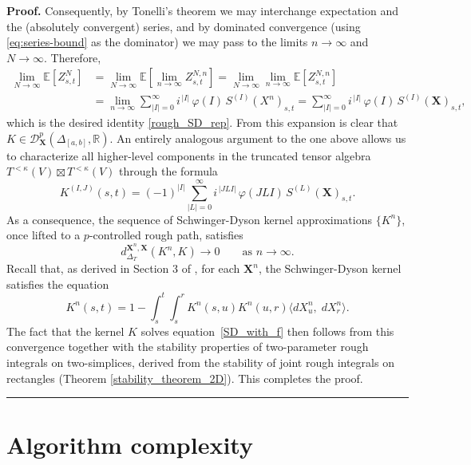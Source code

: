 \documentclass{article}%
\newenvironment{proof}[1][Proof]{\noindent\textbf{#1.} }{\ \rule{0.5em}{0.5em}}
\begin{document}
\begin{proof}
Consequently, by Tonelli’s theorem we may interchange expectation and the (absolutely
convergent) series, and by dominated convergence (using \eqref{eq:series-bound} as the
dominator) we may pass to the limits \(n\to\infty\) and \(N\to\infty\). Therefore,
\[
\begin{aligned}
\lim_{N\to\infty}\mathbb E\left[Z^N_{s,t}\right]
&= \lim_{N\to\infty}\mathbb E\!\left[\lim_{n\to\infty} Z^{N,n}_{s,t}\right]
 = \lim_{N\to\infty}\lim_{n\to\infty}\mathbb E\left[Z^{N,n}_{s,t}\right] \\
&= \lim_{n\to\infty}\sum_{|I|=0}^{\infty} i^{\,|I|}\,\varphi(I)\,S^{(I)}(X^n)_{s,t}
 = \sum_{|I|=0}^{\infty} i^{\,|I|}\,\varphi(I)\,S^{(I)}(\mathbf X)_{s,t},
\end{aligned}
\]
which is the desired identity \eqref{rough_SD_rep}.\newline
From this expansion is clear that $K \in \mathcal{D}^p_{\mathbf{X}}(\Delta_{[a,b]}, \mathbb{R})$. An entirely analogous argument to the one above allows us to characterize all higher-level components in the truncated tensor algebra $T^{<\kappa}(V) \boxtimes T^{<\kappa}(V)$ through the formula
\[
K^{(I, J)}(s,t)
= (-1)^{|I|}\sum_{|L|=0}^{\infty} i^{\,|JLI|}\,\varphi(JLI)\, S^{(L)}(\mathbf{X})_{s,t}.
\]
As a consequence, the sequence of Schwinger-Dyson kernel approximations $\{K^n\}$, once lifted to a $p$-controlled rough path, satisfies
\[
d_{\Delta_T}^{\mathbf{X}^n, \mathbf{X}}(K^n, K) \to 0 \qquad \text{as } n \to \infty.
\]
Recall that, as derived in Section 3 of  \cite{cass2024free}, for each $\mathbf{X}^n$, the Schwinger-Dyson kernel satisfies the equation
\[
K^n(s,t) = 1 -  \int_s^t \int_s^r K^n(s,u) K^n(u,r) \langle dX^n_u, \; dX^n_r \rangle.
\]
The fact that the kernel $K$ solves equation~\eqref{SD_with_f} then follows from this convergence together with the stability properties of two-parameter rough integrals on two-simplices, derived from the stability of joint rough integrals on rectangles (Theorem \ref{stability_theorem_2D}). This completes the proof.
\end{proof}



\section{Algorithm complexity} \label{appendix:algorithmic_complexity}
\end{document}

